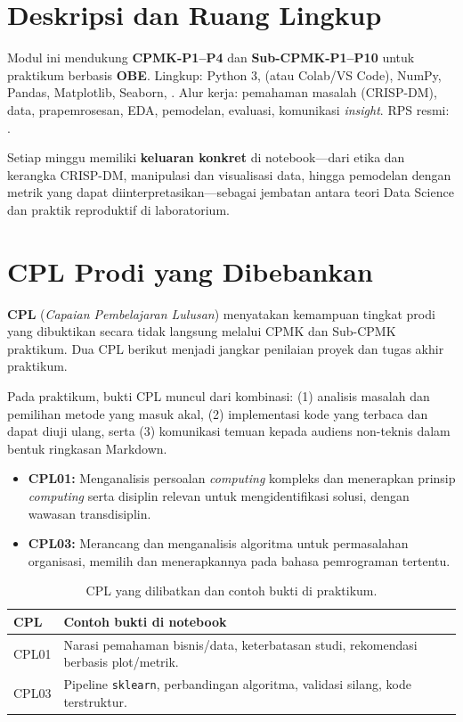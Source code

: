 \documentclass[../main.tex]{subfiles}
\begin{document}
\section{Deskripsi dan Ruang Lingkup}

Modul ini mendukung \textbf{CPMK-P1--P4} dan \textbf{Sub-CPMK-P1--P10} untuk praktikum berbasis \textbf{OBE}. Lingkup: Python 3, \jupyter{} (atau Colab/VS Code), NumPy, Pandas, Matplotlib, Seaborn, \sklearn{}. Alur kerja: pemahaman masalah (CRISP-DM), data, prapemrosesan, EDA, pemodelan, evaluasi, komunikasi \textit{insight}. RPS resmi: .

Setiap minggu memiliki \textbf{keluaran konkret} di notebook---dari etika dan kerangka CRISP-DM, manipulasi dan visualisasi data, hingga pemodelan dengan metrik yang dapat diinterpretasikan---sebagai jembatan antara teori Data Science dan praktik reproduktif di laboratorium.



\section{CPL Prodi yang Dibebankan}

\textbf{CPL} (\textit{Capaian Pembelajaran Lulusan}) menyatakan kemampuan tingkat prodi yang dibuktikan secara tidak langsung melalui CPMK dan Sub-CPMK praktikum. Dua CPL berikut menjadi jangkar penilaian proyek dan tugas akhir praktikum.

Pada praktikum, bukti CPL muncul dari kombinasi: (1) analisis masalah dan pemilihan metode yang masuk akal, (2) implementasi kode yang terbaca dan dapat diuji ulang, serta (3) komunikasi temuan kepada audiens non-teknis dalam bentuk ringkasan Markdown.

\begin{itemize}[leftmargin=*]
  \item \textbf{CPL01:} Menganalisis persoalan \textit{computing} kompleks dan menerapkan prinsip \textit{computing} serta disiplin relevan untuk mengidentifikasi solusi, dengan wawasan transdisiplin.
  \item \textbf{CPL03:} Merancang dan menganalisis algoritma untuk permasalahan organisasi, memilih dan menerapkannya pada bahasa pemrograman tertentu.
\end{itemize}

\begin{table}[htbp]
\centering
\caption{CPL yang dilibatkan dan contoh bukti di praktikum.}
\label{tab:cpl-bukti}
\begin{tabular}{@{}p{1.8cm}p{10.8cm}@{}}
\toprule
\textbf{CPL} & \textbf{Contoh bukti di notebook} \\
\midrule
CPL01 & Narasi pemahaman bisnis/data, keterbatasan studi, rekomendasi berbasis plot/metrik. \\
CPL03 & Pipeline \texttt{sklearn}, perbandingan algoritma, validasi silang, kode terstruktur. \\
\bottomrule
\end{tabular}
\end{table}
\end{document}
